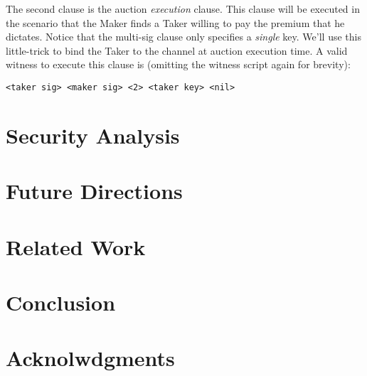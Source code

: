 \documentclass[12pt,a4paper]{article}
\theoremstyle{definition}
\begin{document}
 The second clause is the auction \emph{execution} clause. This clause will be executed in the scenario that the Maker finds a Taker willing to pay the premium that he dictates. Notice that the multi-sig clause only specifies a \emph{single} key. We'll use this little-trick to bind the Taker to the channel at auction execution time. A valid witness to execute this clause is (omitting the witness script again for brevity):
 \begin{verbatim}
<taker sig> <maker sig> <2> <taker key> <nil>
\end{verbatim}

\section{Security Analysis}
\section{Future Directions}
\section{Related Work}
\section{Conclusion}

\section{Acknolwdgments}



\end{document}
